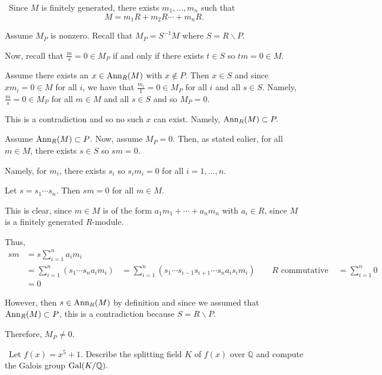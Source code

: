 \documentclass[12pt]{Qual}
\begin{document}
\begin{solution}$\,$
Since $M$ is finitely generated, there exists $m_1,...,m_n$ such that $$M=m_1R+m_2R\cdots+m_nR.$$

\boxed{\implies} Assume $M_P$ is nonzero. Recall that $M_P=S^{-1}M$ where $S=R\backslash P$.

Now, recall that $\frac{m}{s}=0\in M_P$ if and only if there exists $t\in S$ so $tm=0\in M$.

Assume there exists an $x\in\text{Ann}_R(M)$ with $x\notin P$. Then $x\in S$ and since $xm_i=0\in M$ for all $i$, we have that $\frac{m_i}{1}=0\in M_P$ for all $i$ and all $s\in S$. Namely, $\frac{m}{s}=0\in M_P$ for all $m\in M$ and all $s\in S$ and so $M_P=0$.

This is a contradiction and so no such $x$ can exist. Namely, $\text{Ann}_R(M)\subset P.$

\boxed{\impliedby} Assume $\text{Ann}_R(M)\subset P$. Now, assume $M_P=0$. Then, as stated ealier, for all $m\in M$, there exists $s\in S$ so $sm=0$.

Namely, for $m_i$, there exists $s_i$ so $s_im_i=0$ for all $i=1,...,n$.

Let $s=s_1\cdots s_n$. Then $sm=0$ for all $m\in M$.

This is clear, since $m\in M$ is of the form $a_1m_1+\cdots+a_nm_n$ with $a_i\in R$, since $M$ is a finitely generated $R$-module.

Thus, \begin{align*}
    sm&=s\sum_{i=1}^na_im_i\\
    &=\sum_{i=1}^n(s_1\cdots s_na_im_i)
    &=\sum_{i=1}^n(s_1\cdots s_{i-1}s_{i+1}\cdots s_na_is_im_i)\qquad R\text{ commutative }
    &=\sum_{i=1}^n0\\
    &=0
\end{align*}

However, then $s\in \text{Ann}_R(M)$ by definition and since we assumed that $\text{Ann}_R(M)\subset P$, this is a contradiction because $S=R\backslash P$.

Therefore, $M_P\not=0$.

\end{solution}
\newpage



\begin{problem} $\,$
Let $f(x)=x^5+1$. Describe the splitting field $K$ of $f(x)$ over $\mathbb{Q}$ and compute the Galois group $\text{Gal}(K/\mathbb{Q}).$
\end{problem}
\end{document}
